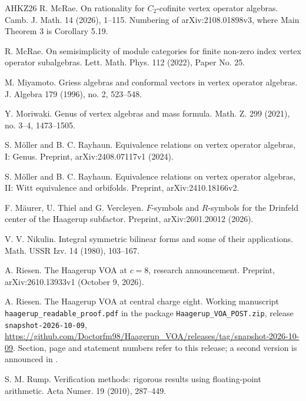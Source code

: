 \documentclass[leqno]{article}
\numberwithin{equation}{section}
\begin{document}
\begin{thebibliography}{AHKZ26}
R. McRae.
\newblock On rationality for $C_2$-cofinite vertex operator algebras.
\newblock Camb. J. Math. 14 (2026), 1--115. Numbering of arXiv:2108.01898v3, where Main Theorem 3 is Corollary 5.19.

R. McRae.
\newblock On semisimplicity of module categories for finite non-zero index vertex operator subalgebras.
\newblock Lett. Math. Phys. 112 (2022), Paper No. 25.

M. Miyamoto.
\newblock Griess algebras and conformal vectors in vertex operator algebras.
\newblock J. Algebra 179 (1996), no. 2, 523--548.

Y. Moriwaki.
\newblock Genus of vertex algebras and mass formula.
\newblock Math. Z. 299 (2021), no. 3--4, 1473--1505.

S. Möller and B. C. Rayhaun.
\newblock Equivalence relations on vertex operator algebras, I: Genus.
\newblock Preprint, arXiv:2408.07117v1 (2024).

S. Möller and B. C. Rayhaun.
\newblock Equivalence relations on vertex operator algebras, II: Witt equivalence and orbifolds.
\newblock Preprint, arXiv:2410.18166v2.

F. Mäurer, U. Thiel and G. Vercleyen.
\newblock $F$-symbols and $R$-symbols for the Drinfeld center of the Haagerup subfactor.
\newblock Preprint, arXiv:2601.20012 (2026).

V. V. Nikulin.
\newblock Integral symmetric bilinear forms and some of their applications.
\newblock Math. USSR Izv. 14 (1980), 103--167.

A. Riesen.
\newblock The Haagerup VOA at $c = 8$, research announcement.
\newblock Preprint, arXiv:2610.13933v1 (October 9, 2026).

A. Riesen.
\newblock The Haagerup VOA at central charge eight.
\newblock Working manuscript \texttt{haagerup\_readable\_proof.pdf} in the package \texttt{Haagerup\_VOA\_POST.zip}, release \texttt{snapshot-2026-10-09}, \url{https://github.com/Doctorfm98/Haagerup_VOA/releases/tag/snapshot-2026-10-09}. Section, page and statement numbers refer to this release; a second version is announced in \cite{Rie26}.

S. M. Rump.
\newblock Verification methods: rigorous results using floating-point arithmetic.
\newblock Acta Numer. 19 (2010), 287--449.


\end{thebibliography}
\end{document}
